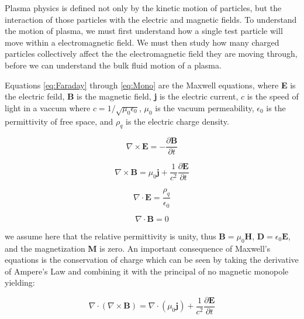 \documentclass[utf8]{report}
\begin{document}
Plasma physics is defined not only by the kinetic motion of particles, but the interaction of those particles with the electric and magnetic fields. To understand the motion of plasma, we must first understand how a single test particle will move within a electromagnetic field. We must then study how many charged particles collectively affect the the electromagnetic field they are moving through, before we can understand the bulk fluid motion of a plasma.

Equations \ref{eq:Faraday} through \ref{eq:Mono} are the Maxwell equations, where \textbf{E} is the electric feild, \textbf{B} is the magnetic field, \textbf{j} is the electric current, $c$ is the speed of light in a vaccum where $c = 1 / \sqrt{\mu_{0}\epsilon_{0}}$, $\mu_{0}$ is the vacuum permeability, $\epsilon_{0}$ is the permittivity of free space, and $\rho_{q}$ is the electric charge density. 

\begin{equation}
    \nabla \times \textbf{E} = - \frac{\partial \textbf{B}}{\partial t}    
    \label{eq:Faraday}
\end{equation}

\begin{equation}
    \nabla \times \textbf{B} = \mu_{0} \textbf{j} + \frac{1}{c^{2}} \frac{\partial \textbf{E}}{\partial t} 
    \label{eq:Ampere}
\end{equation}

\begin{equation}
    \nabla \cdot \textbf{E} = \frac{\rho_{q}}{\epsilon_{0}}
    \label{eq:Gauss}
\end{equation}

\begin{equation}
    \nabla \cdot \textbf{B} = 0
    \label{eq:Mono}
\end{equation}

we assume here that the relative permittivity is unity, thus $\textbf{B} = \mu_{0} \textbf{H}$, $\textbf{D} = \epsilon_{0} \textbf{E}$, and the magnetization \textbf{M} is zero. An important consequence of Maxwell's equations is the conservation of charge which can be seen by taking the derivative of Ampere's Law and combining it with the principal of no magnetic monopole yielding: 

\begin{equation}
    \nabla \cdot (\nabla \times \textbf{B} ) = \nabla \cdot (\mu_{0} \textbf{j}) + \frac{1}{c^{2}} \frac{\partial \textbf{E}}{\partial t}
    \label{eq:ConserveCharge1}
\end{equation}
\end{document}
